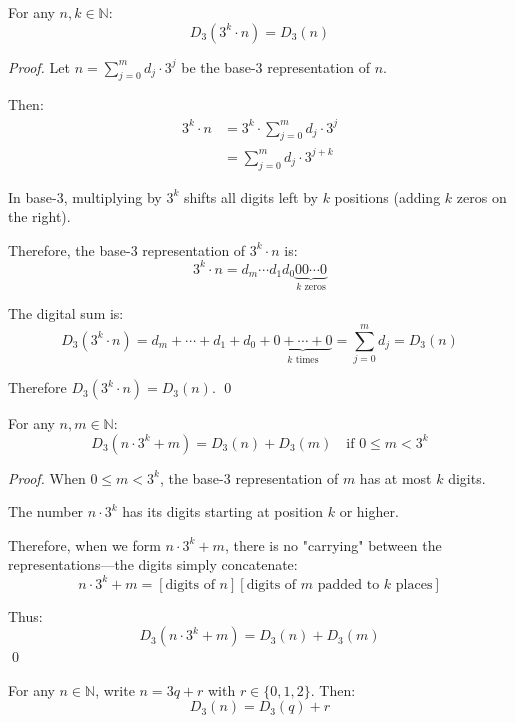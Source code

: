 \begin{theorem}
\label{thm:d3-self-similarity}
For any $n, k \in \mathbb{N}$:
$$D_3(3^k \cdot n) = D_3(n)$$
\end{theorem}

\begin{proof}
Let $n = \sum_{j=0}^{m} d_j \cdot 3^j$ be the base-3 representation of $n$.

Then:
\begin{align}
3^k \cdot n &= 3^k \cdot \sum_{j=0}^{m} d_j \cdot 3^j \\
&= \sum_{j=0}^{m} d_j \cdot 3^{j+k}
\end{align}

In base-3, multiplying by $3^k$ shifts all digits left by $k$ positions (adding $k$ zeros on the right).

Therefore, the base-3 representation of $3^k \cdot n$ is:
$$3^k \cdot n = d_m \cdots d_1 d_0 \underbrace{00\cdots0}_{k \text{ zeros}}$$

The digital sum is:
$$D_3(3^k \cdot n) = d_m + \cdots + d_1 + d_0 + \underbrace{0 + \cdots + 0}_{k \text{ times}} = \sum_{j=0}^{m} d_j = D_3(n)$$

Therefore $D_3(3^k \cdot n) = D_3(n)$. \qed
\end{proof}

\begin{theorem}
\label{thm:d3-addition}
For any $n, m \in \mathbb{N}$:
$$D_3(n \cdot 3^k + m) = D_3(n) + D_3(m) \quad \text{if } 0 \leq m < 3^k$$
\end{theorem}

\begin{proof}
When $0 \leq m < 3^k$, the base-3 representation of $m$ has at most $k$ digits.

The number $n \cdot 3^k$ has its digits starting at position $k$ or higher.

Therefore, when we form $n \cdot 3^k + m$, there is no "carrying" between the representations—the digits simply concatenate:
$$n \cdot 3^k + m = [\text{digits of } n][\text{digits of } m \text{ padded to } k \text{ places}]$$

Thus:
$$D_3(n \cdot 3^k + m) = D_3(n) + D_3(m)$$
\qed
\end{proof}

\begin{corollary}
For any $n \in \mathbb{N}$, write $n = 3q + r$ with $r \in \{0,1,2\}$. Then:
$$D_3(n) = D_3(q) + r$$
\end{corollary}

